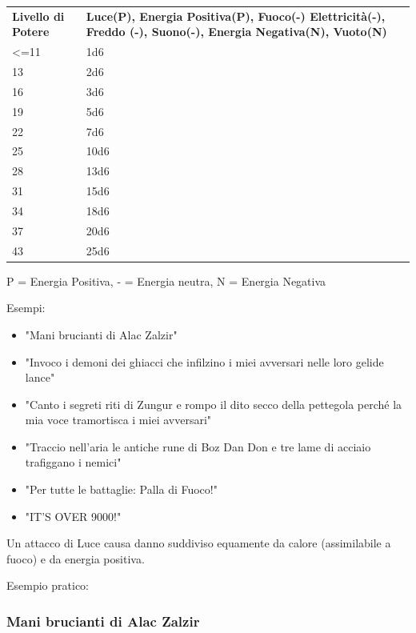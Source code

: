 \documentclass[a4paper,11pt,twoside,openany]{book}
\begin{document}
\begin{tabularx}{0.95\textwidth}{lX}
	\toprule
	\textbf{Livello di Potere} & \textbf{Luce(P), Energia Positiva(P), Fuoco(-) Elettricità(-), Freddo (-), Suono(-), Energia Negativa(N), Vuoto(N)}\\
	<=11                       & 1d6\\
	13                         & 2d6\\
	16                         & 3d6\\
	19                         & 5d6\\
	22                         & 7d6\\
	25                         & 10d6\\
	28                         & 13d6\\
	31                         & 15d6\\
	34                         & 18d6\\
	37                         & 20d6\\
	43                         & 25d6\\
\end{tabularx}

P = Energia Positiva, - = Energia neutra, N = Energia Negativa
\bigskip

Esempi:
\begin{itemize}
	\item
	      "Mani brucianti di Alac Zalzir"
	\item
	      "Invoco i demoni dei ghiacci che infilzino i miei avversari nelle loro gelide lance"
	\item
	      "Canto i segreti riti di Zungur e rompo il dito secco della pettegola perché la mia voce tramortisca i miei avversari"
	\item
	      "Traccio nell'aria le antiche rune di Boz Dan Don e tre lame di acciaio trafiggano i nemici"
	\item
	      "Per tutte le battaglie: Palla di Fuoco!"
	\item
	      "IT'S OVER 9000!"
\end{itemize}
\bigskip

Un attacco di Luce causa danno suddiviso equamente da calore (assimilabile a fuoco) e da energia positiva.

Esempio pratico:

\subsubsection{Mani brucianti di Alac Zalzir}
\end{document}
